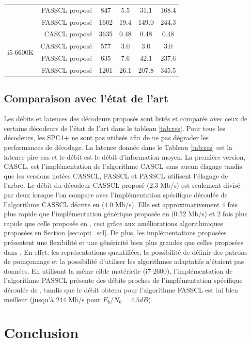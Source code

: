 \begin{table}[t]
{{\begin{tabular}{r|r|c|c c c}
        & PASSCL proposé                   & 847                            & 5.5             & 31.1            & 168.4           \\
        & FASSCL proposé                   & 1602                           & 19.4            & 149.0           & 244.3           \\
        \hline
        \multirow{4}{*}{i5-6600K}
        & CASCL proposé                    & 3635                           & 0.48            & 0.48            & 0.48            \\
        & CASSCL proposé                   & 577                            & 3.0             & 3.0             & 3.0             \\
        & PASSCL proposé                   & 635                            & 7.6             & 42.1            & 237.6           \\
        & FASSCL proposé                   & 1201                           & 26.1            & 207.8           & 345.5           \\
      \end{tabular}
      }}
    \end{table}

\subsection{Comparaison avec l'état de l'art}
Les débits et latences des décodeurs proposés sont listés et comparés avec ceux de certains décodeurs de l'état de l'art dans le tableau \ref{tab:res}. Pour tous les décodeurs, les \noeuds SPC4+ ne sont pas utilisés afin de ne pas dégrader les performances de décodage. La latence donnée dans le Tableau \ref{tab:res} est la latence \og pire cas \fg et le débit est le débit d'information moyen. La première version, CASCL, est l'implémentation de l'algorithme CASCL sans aucun élagage tandis que les versions notées CASSCL, FASSCL et PASSCL utilisent l'élagage de l'arbre. Le débit du décodeur CASSCL proposé (2.3 Mb/s) est seulement divisé par deux lorsque l'on compare avec l'implémentation spécifique déroulée de l'algorithme CASSCL décrite en \cite{sarkis_fast_2016} (4.0 Mb/s). Elle est approximativement 4 fois plus rapide que l'implémentation générique proposée en \cite{sarkis_increasing_2014} (0.52 Mb/s) et 2 fois plus rapide que celle proposée en \cite{shen_low-latency_2016}, ceci grâce aux améliorations algorithmiques proposées en Section \ref{sec:opti_scl}. De plus, les implémentations proposées présentent une flexibilité et une généricité bien plus grandes que celles proposées dans \cite{sarkis_increasing_2014,shen_low-latency_2016}. En effet, les représentations quantifiées, la possibilité de définir des patrons de poinçonnage et la possibilité d'utiliser les algorithmes adaptatifs n'étaient pas données. En utilisant la même cible matérielle (i7-2600), l'implémentation de l'algorithme PASSCL présente des débits proches de l'implémentation spécifique déroulée de \cite{sarkis_fast_2016}, tandis que le débit obtenu pour l'algorithme FASSCL est lui bien meilleur (jusqu'à 244 Mb/s pour $E_b/N_0=4.5dB$).


\section{Conclusion}
